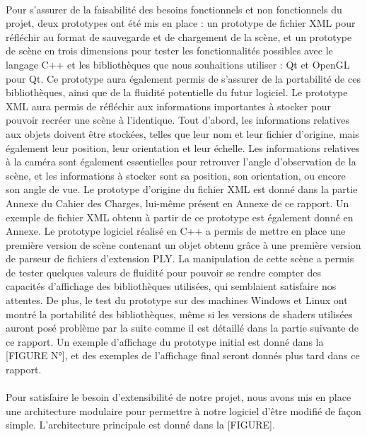 \paragraph{}
Pour s'assurer de la faisabilité des besoins fonctionnels et non fonctionnels du projet, deux prototypes ont été mis en place : un prototype de fichier XML pour réfléchir au format de sauvegarde et de chargement de la scène, et un prototype de scène en trois dimensions pour tester les fonctionnalités possibles avec le langage C++ et les bibliothèques que nous souhaitions utiliser : Qt et OpenGL pour Qt. Ce prototype aura également permis de s'assurer de la portabilité de ces bibliothèques, ainsi que de la fluidité potentielle du futur logiciel.
Le prototype XML aura permis de réfléchir aux informations importantes à stocker pour pouvoir recréer une scène à l'identique. Tout d'abord, les informations relatives aux objets doivent être stockées, telles que leur nom et leur fichier d'origine, mais également leur position, leur orientation et leur échelle. Les informations relatives à la caméra sont également essentielles pour retrouver l'angle d'observation de la scène, et les informations à stocker sont sa position, son orientation, ou encore son angle de vue. Le prototype d'origine du fichier XML est donné dans la partie Annexe du Cahier des Charges, lui-même présent en Annexe de ce rapport. Un exemple de fichier XML obtenu à partir de ce prototype est également donné en Annexe.
Le prototype logiciel réalisé en C++ a permis de mettre en place une première version de scène contenant un objet obtenu grâce à une première version de parseur de fichiers d'extension PLY. La manipulation de cette scène a permis de tester quelques valeurs de fluidité pour pouvoir se rendre compter des capacités d'affichage des bibliothèques utilisées, qui semblaient satisfaire nos attentes. De plus, le test du prototype sur des machines Windows et Linux ont montré la portabilité des bibliothèques, même si les versions de shaders utilisées auront posé problème par la suite comme il est détaillé dans la partie suivante de ce rapport. Un exemple d'affichage du prototype initial est donné dans la [FIGURE N°], et des exemples de l'affichage final seront donnés plus tard dans ce rapport.

\paragraph{}
Pour satisfaire le besoin d'extensibilité de notre projet, nous avons mis en place une architecture modulaire pour permettre à notre logiciel d'être modifié de façon simple. L'architecture principale est donné dans la [FIGURE].

